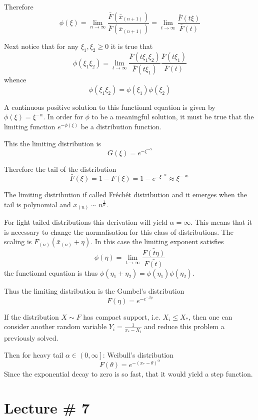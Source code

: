 \documentclass[a4paper]{article}
\newcommand{\ploc}[1]{{\left ( #1 \right ]}}
\begin{document}
Therefore
\[\phi(\xi) = \lim_{n\to\infty} \frac{\bar{F}(\bar{x}_{(n+1)})}{\bar{F}(\bar{x}_{(n+1)}) } = \lim_{t\to\infty} \frac{\bar{F}(t \xi)}{\bar{F}(t) }\]

Next notice that for any $\xi_1, \xi_2\geq 0$ it is true that
\[\phi(\xi_1\xi_2) = \lim_{t\to\infty} \frac{\bar{F}(t \xi_1\xi_2)}{\bar{F}(t\xi_1) } \frac{\bar{F}(t \xi_1)}{\bar{F}(t) }\]
whence \[\phi(\xi_1\xi_2) = \phi(\xi_1)\phi(\xi_2)\]

A continuous positive solution to this functional equation is given by $\phi(\xi) = \xi^{-\alpha}$.
In order for $\phi$ to be a meaningful solution, it must be true that the limiting function $e^{-\phi(\xi)}$ be a distribution function.

This the limiting distribution is
\[G(\xi) = e^{-\xi^{-\alpha}}\]

Therefore the tail of the distribution
\[\bar{F}(\xi) = 1 - F(\xi) = 1-e^{-\xi^{-\alpha}}\approx \xi^{-\approx}\]

The limiting distribution if called Fr\'ech\'et distribution and it emerges when the tail is polynomial and $\bar{x}_{(n)}\sim n^\frac{1}{\alpha}$.

For light tailed distributions this derivation will yield $\alpha=\infty$. This means that it is necessary to change the normalisation for this class of distributions. The scaling is $F_{(n)}(\bar{x}_{(n)} + \eta)$. In this case the limiting exponent satisfies
\[\phi(\eta) =\lim_{t\to\infty} \frac{\bar{F(t\eta)}}{\bar{F(t)}}\]
the functional equation is thus $\phi(\eta_1+\eta_2)=\phi(\eta_1)\phi(\eta_2)$.

Thus the limiting distribution is the Gumbel's distribution
\[F(\eta) = e^{-e^{-\beta\eta}}\]

If the distribution $X\sim F$ has compact support, i.e. $X_i\leq X_*$, then one can consider another random variable $Y_i = \frac{1}{x_*-X_i}$ and reduce this problem a previously solved.

Then for heavy tail $\alpha\in\ploc{0,\infty}$: Weibull's distribution
\[F(\theta) = e^{-{(x_*-\theta)}^\alpha}\]
Since the exponential decay to zero is so fast, that it would yield a step function.



\section{Lecture \# 7} %
\label{sec:lecture_7}
\end{document}
